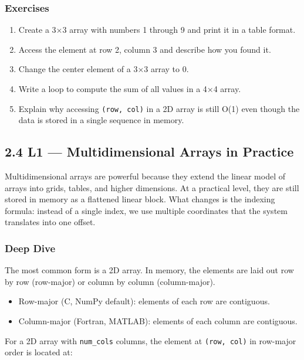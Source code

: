 \documentclass[
  letterpaper,
  DIV=11,
  numbers=noendperiod]{scrreprt}
\providecommand{\tightlist}{%
  \setlength{\itemsep}{0pt}\setlength{\parskip}{0pt}}
\begin{document}
\subsubsection{Exercises}\label{exercises-21}

\begin{enumerate}
\def\labelenumi{\arabic{enumi}.}
\tightlist
\item
  Create a 3×3 array with numbers 1 through 9 and print it in a table
  format.
\item
  Access the element at row 2, column 3 and describe how you found it.
\item
  Change the center element of a 3×3 array to 0.
\item
  Write a loop to compute the sum of all values in a 4×4 array.
\item
  Explain why accessing \texttt{(row,\ col)} in a 2D array is still O(1)
  even though the data is stored in a single sequence in memory.
\end{enumerate}

\subsection{2.4 L1 --- Multidimensional Arrays in
Practice}\label{l1-multidimensional-arrays-in-practice}

Multidimensional arrays are powerful because they extend the linear
model of arrays into grids, tables, and higher dimensions. At a
practical level, they are still stored in memory as a flattened linear
block. What changes is the indexing formula: instead of a single index,
we use multiple coordinates that the system translates into one offset.

\subsubsection{Deep Dive}\label{deep-dive-13}

The most common form is a 2D array. In memory, the elements are laid out
row by row (row-major) or column by column (column-major).

\begin{itemize}
\tightlist
\item
  Row-major (C, NumPy default): elements of each row are contiguous.
\item
  Column-major (Fortran, MATLAB): elements of each column are
  contiguous.
\end{itemize}

For a 2D array with \texttt{num\_cols} columns, the element at
\texttt{(row,\ col)} in row-major order is located at:
\end{document}

